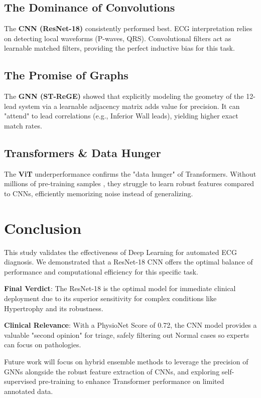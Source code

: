 \documentclass[conference]{IEEEtran}
\begin{document}
\subsection{The Dominance of Convolutions}
The \textbf{CNN (ResNet-18)} consistently performed best. ECG interpretation relies on detecting local waveforms (P-waves, QRS). Convolutional filters act as learnable matched filters, providing the perfect inductive bias for this task.

\subsection{The Promise of Graphs}
The \textbf{GNN (ST-ReGE)} showed that explicitly modeling the geometry of the 12-lead system via a learnable adjacency matrix adds value for precision. It can "attend" to lead correlations (e.g., Inferior Wall leads), yielding higher exact match rates.

\subsection{Transformers \& Data Hunger}
The \textbf{ViT} underperformance confirms the "data hunger" of Transformers. Without millions of pre-training samples \cite{moody2025foundation}, they struggle to learn robust features compared to CNNs, efficiently memorizing noise instead of generalizing.

\section{Conclusion}
This study validates the effectiveness of Deep Learning for automated ECG diagnosis. We demonstrated that a ResNet-18 CNN offers the optimal balance of performance and computational efficiency for this specific task. 

\textbf{Final Verdict}: The ResNet-18 is the optimal model for immediate clinical deployment due to its superior sensitivity for complex conditions like Hypertrophy and its robustness.

\textbf{Clinical Relevance}: With a PhysioNet Score of 0.72, the CNN model provides a valuable "second opinion" for triage, safely filtering out Normal cases so experts can focus on pathologies.

Future work will focus on hybrid ensemble methods to leverage the precision of GNNs alongside the robust feature extraction of CNNs, and exploring self-supervised pre-training to enhance Transformer performance on limited annotated data.
\end{document}
